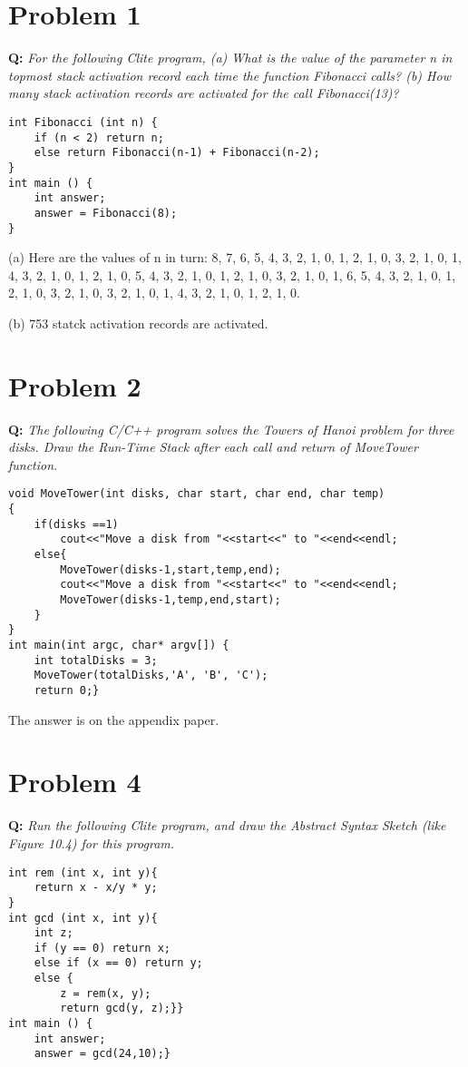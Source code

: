 \documentclass{article}
\begin{document}
\section*{Problem 1}
\textbf{Q:} \textit{For the following Clite program, (a) What is the value of the parameter n in topmost stack activation record each time the function Fibonacci calls? (b) How many stack activation records are activated for the call Fibonacci(13)?}

\begin{lstlisting}
int Fibonacci (int n) {
    if (n < 2) return n;
    else return Fibonacci(n-1) + Fibonacci(n-2);
}
int main () {
    int answer;
    answer = Fibonacci(8);
}
\end{lstlisting}

(a) Here are the values of n in turn: 8, 7, 6, 5, 4, 3, 2, 1, 0, 1, 2, 1, 0, 3, 2, 1, 0, 1, 4, 3, 2, 1, 0, 1, 2, 1, 0, 5, 4, 3, 2, 1, 0, 1, 2, 1, 0, 3, 2, 1, 0, 1, 6, 5, 4, 3, 2, 1, 0, 1, 2, 1, 0, 3, 2, 1, 0, 3, 2, 1, 0, 1, 4, 3, 2, 1, 0, 1, 2, 1, 0.

(b) 753 statck activation records are activated.

\section*{Problem 2}
\textbf{Q:} \textit{The following C/C++ program solves the Towers of Hanoi problem for three disks. Draw the Run-Time Stack after each call and return of MoveTower function.}

\begin{lstlisting}
void MoveTower(int disks, char start, char end, char temp)
{
    if(disks ==1)
        cout<<"Move a disk from "<<start<<" to "<<end<<endl;
    else{
        MoveTower(disks-1,start,temp,end);
        cout<<"Move a disk from "<<start<<" to "<<end<<endl;
        MoveTower(disks-1,temp,end,start);
    }
}
int main(int argc, char* argv[]) {
    int totalDisks = 3;
    MoveTower(totalDisks,'A', 'B', 'C');
    return 0;}
\end{lstlisting}

The answer is on the appendix paper.

\section*{Problem 4}
\textbf{Q:} \textit{Run the following Clite program, and draw the Abstract Syntax Sketch (like Figure 10.4) for this program.}

\begin{lstlisting}
int rem (int x, int y){
    return x - x/y * y;
}
int gcd (int x, int y){
    int z;
    if (y == 0) return x;
    else if (x == 0) return y;
    else {
        z = rem(x, y);
        return gcd(y, z);}}
int main () {
    int answer;
    answer = gcd(24,10);}
\end{lstlisting}
\end{document}
